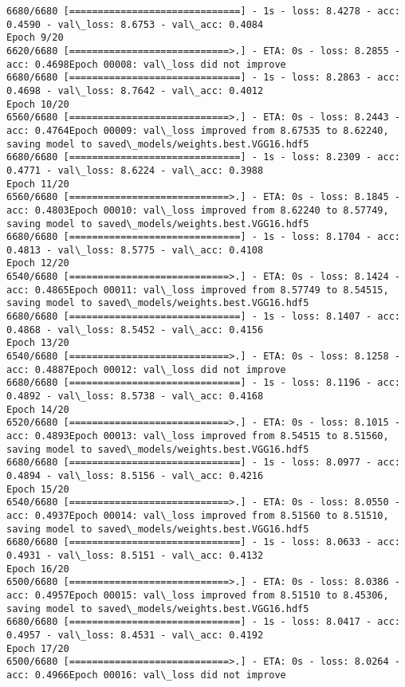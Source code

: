 \documentclass[11pt]{article}
\begin{document}
\begin{Verbatim}[commandchars=\\\{\}]
6680/6680 [==============================] - 1s - loss: 8.4278 - acc: 0.4590 - val\_loss: 8.6753 - val\_acc: 0.4084
Epoch 9/20
6620/6680 [============================>.] - ETA: 0s - loss: 8.2855 - acc: 0.4698Epoch 00008: val\_loss did not improve
6680/6680 [==============================] - 1s - loss: 8.2863 - acc: 0.4698 - val\_loss: 8.7642 - val\_acc: 0.4012
Epoch 10/20
6560/6680 [============================>.] - ETA: 0s - loss: 8.2443 - acc: 0.4764Epoch 00009: val\_loss improved from 8.67535 to 8.62240, saving model to saved\_models/weights.best.VGG16.hdf5
6680/6680 [==============================] - 1s - loss: 8.2309 - acc: 0.4771 - val\_loss: 8.6224 - val\_acc: 0.3988
Epoch 11/20
6560/6680 [============================>.] - ETA: 0s - loss: 8.1845 - acc: 0.4803Epoch 00010: val\_loss improved from 8.62240 to 8.57749, saving model to saved\_models/weights.best.VGG16.hdf5
6680/6680 [==============================] - 1s - loss: 8.1704 - acc: 0.4813 - val\_loss: 8.5775 - val\_acc: 0.4108
Epoch 12/20
6540/6680 [============================>.] - ETA: 0s - loss: 8.1424 - acc: 0.4865Epoch 00011: val\_loss improved from 8.57749 to 8.54515, saving model to saved\_models/weights.best.VGG16.hdf5
6680/6680 [==============================] - 1s - loss: 8.1407 - acc: 0.4868 - val\_loss: 8.5452 - val\_acc: 0.4156
Epoch 13/20
6540/6680 [============================>.] - ETA: 0s - loss: 8.1258 - acc: 0.4887Epoch 00012: val\_loss did not improve
6680/6680 [==============================] - 1s - loss: 8.1196 - acc: 0.4892 - val\_loss: 8.5738 - val\_acc: 0.4168
Epoch 14/20
6520/6680 [============================>.] - ETA: 0s - loss: 8.1015 - acc: 0.4893Epoch 00013: val\_loss improved from 8.54515 to 8.51560, saving model to saved\_models/weights.best.VGG16.hdf5
6680/6680 [==============================] - 1s - loss: 8.0977 - acc: 0.4894 - val\_loss: 8.5156 - val\_acc: 0.4216
Epoch 15/20
6540/6680 [============================>.] - ETA: 0s - loss: 8.0550 - acc: 0.4937Epoch 00014: val\_loss improved from 8.51560 to 8.51510, saving model to saved\_models/weights.best.VGG16.hdf5
6680/6680 [==============================] - 1s - loss: 8.0633 - acc: 0.4931 - val\_loss: 8.5151 - val\_acc: 0.4132
Epoch 16/20
6500/6680 [============================>.] - ETA: 0s - loss: 8.0386 - acc: 0.4957Epoch 00015: val\_loss improved from 8.51510 to 8.45306, saving model to saved\_models/weights.best.VGG16.hdf5
6680/6680 [==============================] - 1s - loss: 8.0417 - acc: 0.4957 - val\_loss: 8.4531 - val\_acc: 0.4192
Epoch 17/20
6500/6680 [============================>.] - ETA: 0s - loss: 8.0264 - acc: 0.4966Epoch 00016: val\_loss did not improve

\end{Verbatim}
\end{document}
